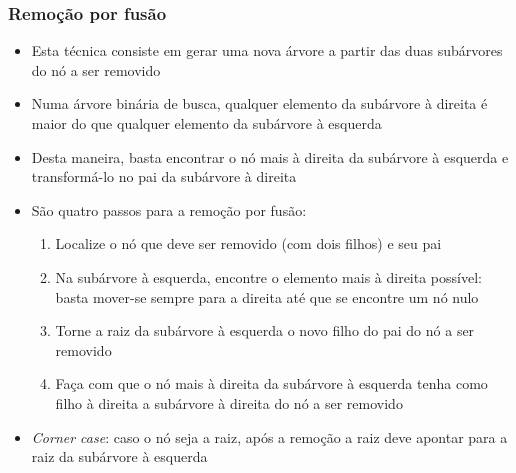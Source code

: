 \begin{frame}[fragile]\frametitle{Remoção por fusão}

	\begin{itemize}
		\item Esta técnica consiste em gerar uma nova árvore a partir das duas subárvores do nó a 
            ser removido

		\item Numa árvore binária de busca, qualquer elemento da subárvore à direita é maior do 
            que qualquer elemento da subárvore à esquerda

		\item Desta maneira, basta encontrar o nó mais à direita da subárvore à esquerda e 
            transformá-lo no pai da subárvore à direita

        \item São quatro passos para a remoção por fusão:

        \begin{enumerate}
            \item Localize o nó que deve ser removido (com dois filhos) e seu pai

            \item Na subárvore à esquerda, encontre o elemento mais à direita possível: 
                basta mover-se sempre para a direita até que se encontre um nó nulo

            \item Torne a raiz da subárvore à esquerda o novo filho do pai do nó a ser removido 

            \item Faça com que o nó mais à direita da subárvore à esquerda tenha como filho à 
                direita a subárvore à direita do nó a ser removido
        \end{enumerate}

        \item \textit{Corner case}: caso o nó seja a raiz, após a remoção a raiz deve apontar 
            para a raiz da subárvore à esquerda
    \end{itemize}

\end{frame}

